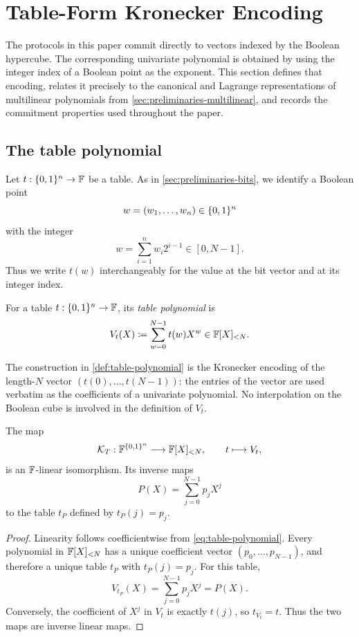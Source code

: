 \section{Table-Form Kronecker Encoding}
\label{sec:table-encoding}

The protocols in this paper commit directly to vectors indexed by the Boolean hypercube.  The corresponding univariate polynomial is obtained by using the integer index of a Boolean point as the exponent.  This section defines that encoding, relates it precisely to the canonical and Lagrange representations of multilinear polynomials from \cref{sec:preliminaries-multilinear}, and records the commitment properties used throughout the paper.

\subsection{The table polynomial}
\label{sec:table-polynomial}

Let $t:\{0,1\}^n\to\mathbb{F}$ be a table.  As in \cref{sec:preliminaries-bits}, we identify a Boolean point
\[
  w=(w_1,\ldots,w_n)\in\{0,1\}^n
\]
with the integer
\[
  w=\sum_{i=1}^{n}w_i2^{i-1}\in[0,N-1].
\]
Thus we write $t(w)$ interchangeably for the value at the bit vector and at its integer index.

\begin{definition}
\label{def:table-polynomial}
For a table $t:\{0,1\}^n\to\mathbb{F}$, its \emph{table polynomial} is
\begin{equation}
  V_t(X)
  \coloneqq
  \sum_{w=0}^{N-1}t(w)X^w
  \in\mathbb{F}[X]_{<N}.
  \label{eq:table-polynomial}
\end{equation}
\end{definition}

The construction in \cref{def:table-polynomial} is the Kronecker encoding of the length-$N$ vector $(t(0),\ldots,t(N-1))$: the entries of the vector are used verbatim as the coefficients of a univariate polynomial.  No interpolation on the Boolean cube is involved in the definition of $V_t$.

\begin{proposition}
\label{prop:table-isomorphism}
The map
\[
  \mathcal K_T:\mathbb{F}^{\{0,1\}^n}\longrightarrow\mathbb{F}[X]_{<N},
  \qquad
  t\longmapsto V_t,
\]
is an $\mathbb{F}$-linear isomorphism.  Its inverse maps
\[
  P(X)=\sum_{j=0}^{N-1}p_jX^j
\]
to the table $t_P$ defined by $t_P(j)=p_j$.
\end{proposition}

\begin{proof}
Linearity follows coefficientwise from \eqref{eq:table-polynomial}.  Every polynomial in $\mathbb{F}[X]_{<N}$ has a unique coefficient vector $(p_0,\ldots,p_{N-1})$, and therefore a unique table $t_P$ with $t_P(j)=p_j$.  For this table,
\[
  V_{t_P}(X)=\sum_{j=0}^{N-1}p_jX^j=P(X).
\]
Conversely, the coefficient of $X^j$ in $V_t$ is exactly $t(j)$, so $t_{V_t}=t$.  Thus the two maps are inverse linear maps.
\end{proof}

